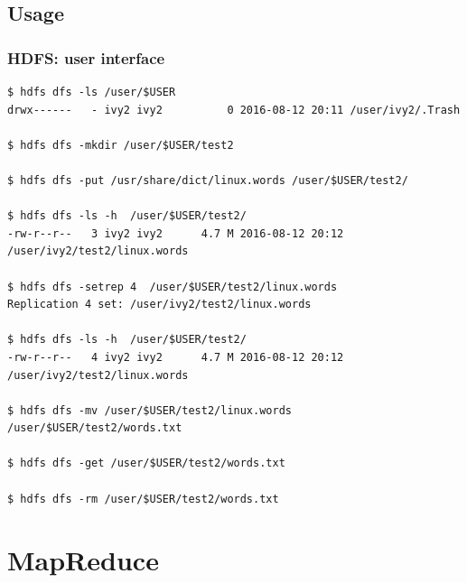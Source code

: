 \documentclass{beamer}
\begin{document}
\subsection{Usage}
\begin{frame}[fragile]
  \frametitle{HDFS: user interface}
{\color{mycolorcli}
  \begin{lstlisting}[frame=single, basicstyle=\tiny]
$ hdfs dfs -ls /user/$USER
drwx------   - ivy2 ivy2          0 2016-08-12 20:11 /user/ivy2/.Trash                                                                                                                                                                     

$ hdfs dfs -mkdir /user/$USER/test2 

$ hdfs dfs -put /usr/share/dict/linux.words /user/$USER/test2/

$ hdfs dfs -ls -h  /user/$USER/test2/
-rw-r--r--   3 ivy2 ivy2      4.7 M 2016-08-12 20:12 /user/ivy2/test2/linux.words

$ hdfs dfs -setrep 4  /user/$USER/test2/linux.words
Replication 4 set: /user/ivy2/test2/linux.words

$ hdfs dfs -ls -h  /user/$USER/test2/
-rw-r--r--   4 ivy2 ivy2      4.7 M 2016-08-12 20:12 /user/ivy2/test2/linux.words

$ hdfs dfs -mv /user/$USER/test2/linux.words /user/$USER/test2/words.txt

$ hdfs dfs -get /user/$USER/test2/words.txt

$ hdfs dfs -rm /user/$USER/test2/words.txt
  \end{lstlisting}
}
\end{frame}


\section{MapReduce}
\end{document}
